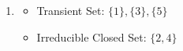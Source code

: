 \documentclass[12pt]{article}
\begin{document}
\begin{enumerate}[label=(\alph*)]
\item
        \begin{minipage}[t]{0.4\textwidth}
          \centering{}
        
        
        \end{minipage}\hfill
        \begin{minipage}[t]{0.65\textwidth}
          \vspace{3\baselineskip}
          \begin{itemize}
                \item Transient Set: $\{1\},\{3\}, \{5\}$
                \item Irreducible Closed Set: $\{2,4\}$
          \end{itemize}
        \end{minipage}



\end{enumerate}
\end{document}
